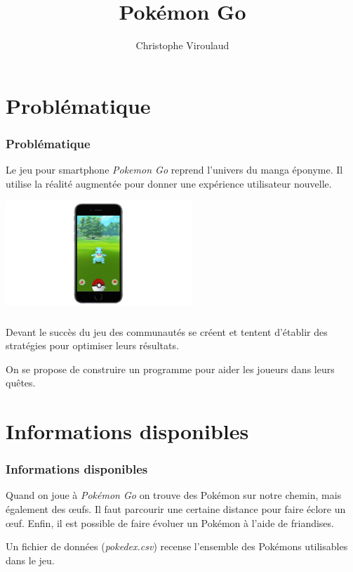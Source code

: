 \documentclass[svgnames,11pt]{beamer}
\author[]{Christophe Viroulaud}
\title{Pokémon Go}
\date{}
\institute{Première NSI}
\begin{document}
\begin{frame}
    \titlepage
\end{frame}

\section{Problématique}
\begin{frame}
    \frametitle{Problématique}

    Le jeu pour smartphone \emph{Pokemon Go} reprend l'univers du manga éponyme. Il utilise la réalité augmentée pour donner une expérience utilisateur nouvelle.
    \begin{center}
        \centering
        \includegraphics[width=7cm]{ressources/pokemongo.jpg}
    \end{center}


\end{frame}

\begin{frame}
    \frametitle{}

    Devant le succès du jeu des communautés se créent et tentent d'établir des stratégies pour optimiser leurs résultats.

    \begin{center}
        {\Large On se propose de construire un programme pour aider les joueurs dans leurs quêtes.}
    \end{center}
\end{frame}
\section{Informations disponibles}
\begin{frame}
    \frametitle{Informations disponibles}

    Quand on joue à \emph{Pokémon Go} on trouve des Pokémon sur notre chemin, mais également des œufs. Il faut parcourir une certaine distance pour faire éclore un œuf. Enfin, il est possible de faire évoluer un Pokémon à l'aide de friandises.

    Un fichier de données (\emph{pokedex.csv}) recense l'ensemble des Pokémons utilisables dans le jeu.

\end{frame}
\end{document}
